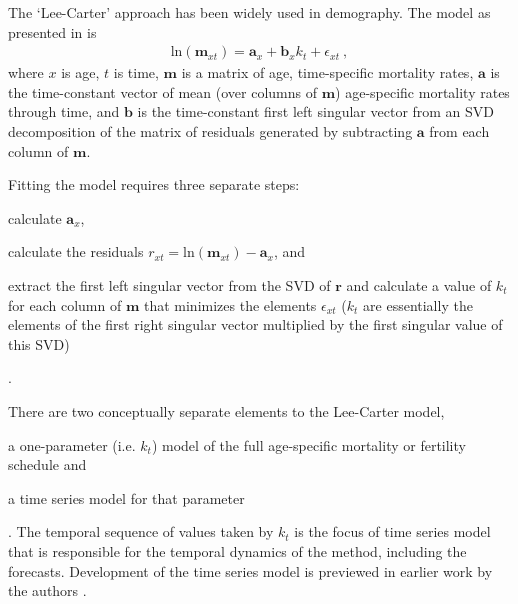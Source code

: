 \documentclass[11pt]{article}
\newcommand{\mbf}{\mathbf}
\begin{document}
The `Lee-Carter' approach \citep{lee1992modeling, lee1993modeling} has been widely used in demography.  The model as presented in \cite{lee1992modeling} is %
%
\begin{align}
\mbox{ln}(\mbf{m}_{xt}) = \mbf{a}_x + \mbf{b}_xk_t + \epsilon_{xt} \ , 
\label{eq:leeCarter}
\end{align} %
%
where $x$ is age, $t$ is time, $\mbf{m}$ is a matrix of age, time-specific mortality rates, $\mbf{a}$ is the time-constant vector of mean (over columns of $\mbf{m}$)  age-specific mortality rates through time, and $\mbf{b}$ is the time-constant first left singular vector from an SVD decomposition of the matrix of residuals generated by subtracting $\mbf{a}$ from each column of $\mbf{m}$. 

Fitting the model requires three separate steps: 
\begin{enumerate*}[label=\arabic*)]
\item calculate $\mbf{a}_x$,
\item calculate the residuals $r_{xt} = \mbox{ln}(\mbf{m}_{xt}) - \mbf{a}_x$, and
\item \label{lc:last} extract the first left singular vector from the SVD of $\mbf{r}$ and calculate a value of $k_t$ for each column of $\mbf{m}$ that minimizes the elements $\epsilon_{xt}$ ($k_t$ are essentially the elements of the first right singular vector multiplied by the first singular value of this SVD)
\end{enumerate*}.

There are two conceptually separate elements to the Lee-Carter model, 
\begin{enumerate*}[label=\arabic*)]
\item a one-parameter (i.e. $k_t$) model of the full age-specific mortality or fertility schedule and
\item a time series model for that parameter
\end{enumerate*}.
The temporal sequence of values taken by $k_t$ is the focus of  time series model that is responsible for the temporal dynamics of the method, including the forecasts.  Development of the time series model is previewed in earlier work by the authors \citep{carter1986joint}. 
\end{document}
